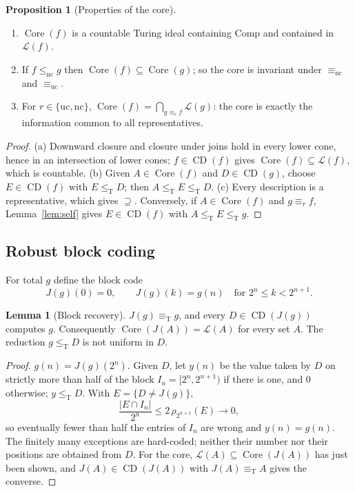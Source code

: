 \documentclass[11pt,letterpaper]{article}
\theoremstyle{definition}
\newtheorem{proposition}[definition]{Proposition}
\newtheorem{lemma}[definition]{Lemma}
\numberwithin{equation}{section}
\newcommand{\leT}{\le_{\mathrm T}}
\newcommand{\eqT}{\equiv_{\mathrm T}}
\newcommand{\lenc}{\le_{\mathrm{nc}}}
\newcommand{\eqnc}{\equiv_{\mathrm{nc}}}
\newcommand{\equc}{\equiv_{\mathrm{uc}}}
\newcommand{\nc}{\mathrm{nc}}
\newcommand{\uc}{\mathrm{uc}}
\newcommand{\CD}{\operatorname{CD}}
\newcommand{\Low}{\mathcal L}
\newcommand{\Core}{\operatorname{Core}}
\newcommand{\Comp}{\mathrm{Comp}}
\newcommand{\J}{J}
\newcommand{\src}[1]{\leavevmode{\sffamily\footnotesize\color{Steel}[#1]}}
\begin{document}
\begin{proposition}[Properties of the core]\label{prop:core}\src{R1, R5, R8, R9}
\begin{enumerate}[label=\textup{(\alph*)}]
\item $\Core(f)$ is a countable Turing ideal containing $\Comp$ and contained in $\Low(f)$.
\item If $f\lenc g$ then $\Core(f)\subseteq\Core(g)$; so the core is invariant under $\eqnc$ and $\equc$.
\item For $r\in\{\uc,\nc\}$, $\Core(f)=\bigcap_{g\equiv_rf}\Low(g)$: the core is exactly the information common to all representatives.
\end{enumerate}
\end{proposition}
\begin{proof}
(a) Downward closure and closure under joins hold in every lower cone, hence in an intersection of lower cones; $f\in\CD(f)$ gives $\Core(f)\subseteq\Low(f)$, which is countable. (b) Given $A\in\Core(f)$ and $D\in\CD(g)$, choose $E\in\CD(f)$ with $E\leT D$; then $A\leT E\leT D$. (c) Every description is a representative, which gives $\supseteq$. Conversely, if $A\in\Core(f)$ and $g\equiv_rf$, Lemma~\ref{lem:self} gives $E\in\CD(f)$ with $A\leT E\leT g$.
\end{proof}

\subsection{Robust block coding}
For total $g$ define the block code
\begin{equation}\label{eq:J}
 \J(g)(0)=0,\qquad \J(g)(k)=g(n)\quad\text{for }2^n\le k<2^{n+1}.
\end{equation}

\begin{lemma}[Block recovery]\label{lem:block}\src{R1, R2, R5, R6, R7, R8, R9}
$\J(g)\eqT g$, and every $D\in\CD(\J(g))$ computes $g$. Consequently $\Core(\J(A))=\Low(A)$ for every set $A$. The reduction $g\leT D$ is not uniform in $D$.
\end{lemma}
\begin{proof}
$g(n)=\J(g)(2^n)$. Given $D$, let $y(n)$ be the value taken by $D$ on strictly more than half of the block $I_n=[2^n,2^{n+1})$ if there is one, and $0$ otherwise; $y\leT D$. With $E=\{D\ne\J(g)\}$,
\[
 \frac{|E\cap I_n|}{2^n}\le2\,\rho_{2^{n+1}}(E)\longrightarrow0,
\]
so eventually fewer than half the entries of $I_n$ are wrong and $y(n)=g(n)$. The finitely many exceptions are hard-coded; neither their number nor their positions are obtained from $D$. For the core, $\Low(A)\subseteq\Core(\J(A))$ has just been shown, and $\J(A)\in\CD(\J(A))$ with $\J(A)\eqT A$ gives the converse.
\end{proof}
\end{document}
